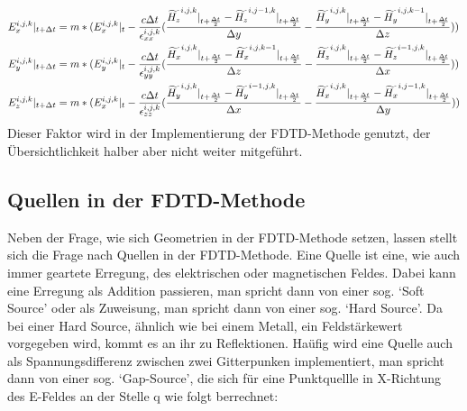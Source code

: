 \documentclass[11pt, ngerman]{article}
\begin{document}
\begin{align}
	\Ef{x}{i,j,k}{+} &= m*(\Ef{x}{i,j,k}{0} - \frac{c\Delta t}{\epsilon_{xx}^{i,j,k}}(\frac{\Hf{z}{i,j,k}{+} - \Hf{z}{i,j-1,k}{+}}{\Delta y} - \frac{\Hf{y}{i,j,k}{+} - \Hf{y}{i,j,k-1}{+}}{\Delta z}))\\
	\Ef{y}{i,j,k}{+} &= m*(\Ef{y}{i,j,k}{0} - \frac{c\Delta t}{\epsilon_{yy}^{i,j,k}}(\frac{\Hf{x}{i,j,k}{+} - \Hf{x}{i,j,k-1}{+}}{\Delta z} - \frac{\Hf{z}{i,j,k}{+} - \Hf{z}{i-1,j,k}{+}}{\Delta x}))\\
	\Ef{z}{i,j,k}{+} &= m*(\Ef{x}{i,j,k}{0} - \frac{c\Delta t}{\epsilon_{zz}^{i,j,k}}(\frac{\Hf{y}{i,j,k}{+} - \Hf{y}{i-1,j,k}{+}}{\Delta x} - \frac{\Hf{x}{i,j,k}{+} - \Hf{x}{i,j-1,k}{+}}{\Delta y}))
\end{align}
Dieser Faktor wird in der Implementierung der FDTD-Methode genutzt, der \"Ubersichtlichkeit halber aber nicht weiter mitgef\"uhrt.
\newpage

\subsection{Quellen in der FDTD-Methode}
Neben der Frage, wie sich Geometrien in der FDTD-Methode setzen, lassen stellt sich die Frage nach Quellen in der FDTD-Methode.
Eine Quelle ist eine, wie auch immer geartete Erregung, des elektrischen oder magnetischen Feldes.
Dabei kann eine Erregung als Addition passieren, man spricht dann von einer sog. `Soft Source' oder als Zuweisung,
man spricht dann von einer sog. `Hard Source'.\cite{sources}
Da bei einer Hard Source, \"ahnlich wie bei einem Metall, ein Feldst\"arkewert vorgegeben
wird, kommt es an ihr zu Reflektionen. Ha\"ufig wird eine Quelle auch als Spannungsdifferenz
zwischen zwei Gitterpunken implementiert, man spricht dann von einer sog. `Gap-Source',
die sich f\"ur eine Punktquellle in X-Richtung des E-Feldes an der Stelle q 
wie folgt berrechnet\cite{advanced_gap_feed}:
\end{document}
